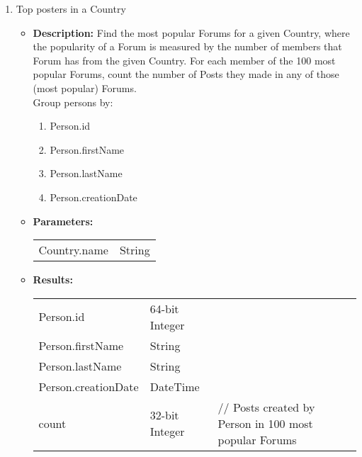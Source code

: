 {\begin{enumerate}
\begin{itemize}
                  \item \textbf{Limit:} 20 \\
                    \end{itemize}

      \item Top posters in a Country
            \begin{itemize}
                \item \textbf{Description:}
                  Find the most popular Forums for a given Country,
                  where the popularity of a Forum is measured by the number of members that Forum has from the given Country.
                  For each member of the 100 most popular Forums,
                  count the number of Posts they made in any of those (most popular) Forums. \\
                  Group persons by:
                  \begin{enumerate}
                      \item Person.id
                      \item Person.firstName
                      \item Person.lastName
                      \item Person.creationDate
                  \end{enumerate}
                \item \textbf{Parameters:} \\
                    \begin{tabular}{ll}
                      Country.name & String \\
                    \end{tabular}
                \item \textbf{Results:} \\
                    \begin{tabular}{lll}
                      Person.id & 64-bit Integer & \\
                      Person.firstName & String & \\
                      Person.lastName & String & \\
                      Person.creationDate & DateTime & \\
                      count & 32-bit Integer & \parbox[t]{20cm}{ // Posts created by Person in 100 most popular Forums\strut}  \\
                    \end{tabular}


\end{itemize}
\end{enumerate}}
